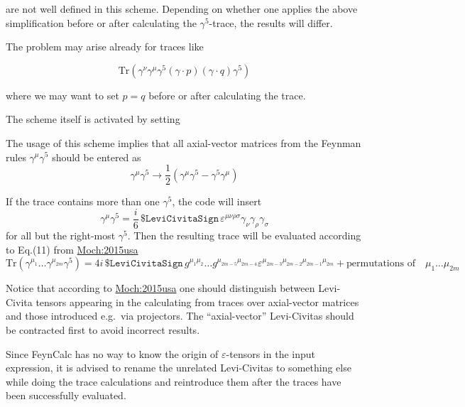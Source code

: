 \documentclass[../FeynCalcManual.tex]{subfiles}
\begin{document}
are not well defined in this scheme. Depending on whether one applies
the above simplification before or after calculating the
\(\gamma^5\)-trace, the results will differ.

The problem may arise already for traces like

\begin{equation}
\mathrm{Tr}(\gamma^\nu \gamma^\mu \gamma^5 (\gamma \cdot p) (\gamma \cdot q) \gamma^{5})
\end{equation}

where we may want to set \(p=q\) before or after calculating the trace.

The scheme itself is activated by setting

\begin{Shaded}
\begin{Highlighting}[]
\OperatorTok{[}\OperatorTok{]}
\end{Highlighting}
\end{Shaded}

The usage of this scheme implies that all axial-vector matrices from the
Feynman rules \(\gamma^\mu \gamma^5\) should be entered as
\begin{equation}
\gamma^\mu \gamma^5 \to \frac{1}{2} \left ( \gamma^\mu \gamma^5 -  \gamma^5 \gamma^\mu \right )
\end{equation}

If the trace contains more than one \(\gamma^5\), the code will insert
\begin{equation}
\gamma^\mu \gamma^5 = \frac{i}{6} \, \texttt{\$LeviCivitaSign} \, \varepsilon^{\mu \nu \rho \sigma} \gamma_\nu \gamma_\rho \gamma_\sigma
\end{equation} for all but the right-most \(\gamma^5\). Then the
resulting trace will be evaluated according to Eq.(11) from
\href{https://arxiv.org/pdf/1506.04517.pdf}{Moch:2015usa}
\begin{equation}
\mathrm{Tr}(\gamma^{\mu_1} \ldots \gamma^{\mu_{2m}} \gamma^5) =  4 i \, \texttt{\$LeviCivitaSign} \, g^{\mu_1 \mu_2} \ldots g^{\mu_{2m-5} \mu_{2m-4}} \varepsilon^{\mu_{2m-3} \mu_{2m-2} \mu_{2m-1} \mu_{2m}} + \textrm{permutations of} \quad \mu_{1} \ldots {\mu_{2m}}
\end{equation}

Notice that according to
\href{https://arxiv.org/pdf/1506.04517.pdf}{Moch:2015usa} one should
distinguish between Levi-Civita tensors appearing in the calculating
from traces over axial-vector matrices and those introduced e.g.~via
projectors. The ``axial-vector'' Levi-Civitas should be contracted first
to avoid incorrect results.

Since FeynCalc has no way to know the origin of \(\varepsilon\)-tensors
in the input expression, it is advised to rename the unrelated
Levi-Civitas to something else while doing the trace calculations and
reintroduce them after the traces have been successfully evaluated.
\end{document}

